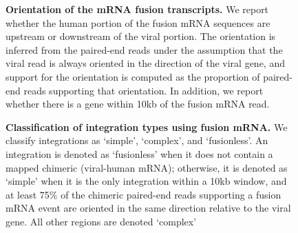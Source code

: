 \documentclass[12pt]{article}
\begin{document}

\begin{figure}[htpb]
  \centering
\caption[Orientation of the mRNA fusion transcripts.]
{\label{mrna_directions}  {\bf Orientation of the mRNA fusion transcripts.}  We report whether the human portion of the fusion mRNA sequences are upstream or downstream of the viral portion.  The orientation is inferred from the paired-end reads under the assumption that the viral read is always oriented in the direction of the viral gene, and support for the orientation is computed as the proportion of paired-end reads supporting that orientation.  In addition, we report whether there is a gene within 10kb of the fusion mRNA read.}
\end{figure}

\begin{figure}[htpb] \centering
  \caption[Classification of integrations.]  {\label{classification} {\small {\bf
        Classification of integration types using fusion mRNA.}  We classify integrations as
        `simple', `complex', and `fusionless'.  An integration is denoted as
      `fusionless' when it does not contain a mapped chimeric
      (viral-human mRNA); otherwise, it is denoted as `simple' when it
      is the only integration within a 10kb window, and at least 75\%
      of the chimeric paired-end reads supporting a fusion mRNA event
      are oriented in the same direction relative to the viral
      gene. All other regions are denoted `complex'}} %
\end{figure}
\end{document}
